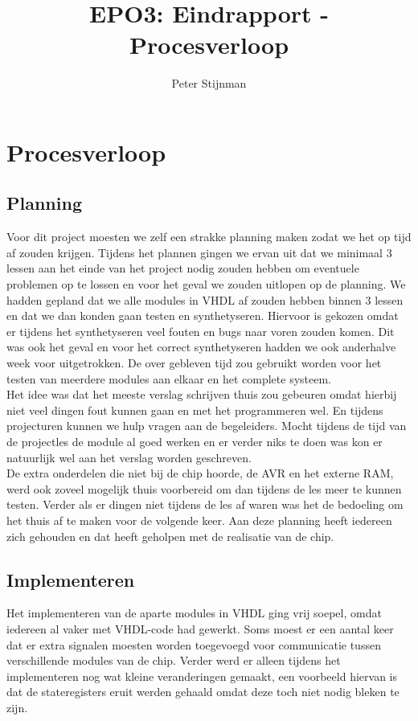 \documentclass{scrartcl} %
\author{Peter Stijnman}
\title{EPO3: Eindrapport - Procesverloop}
\begin{document}
\chapter{Procesverloop}
\label{ch:procesverloop}

\section{ Planning}

Voor dit project moesten we zelf een strakke planning maken zodat we het op tijd af zouden krijgen. Tijdens het plannen gingen we ervan uit dat we minimaal 3 lessen aan het einde van het project nodig zouden hebben om eventuele problemen op te lossen
en voor het geval we zouden uitlopen op de planning. We hadden gepland dat we alle modules in VHDL af zouden hebben binnen 3 lessen en dat we dan konden gaan testen en synthetyseren. Hiervoor is gekozen omdat er tijdens het synthetyseren veel fouten en bugs naar voren zouden komen.
Dit was ook het geval en voor het correct synthetyseren hadden we ook anderhalve week voor uitgetrokken. De over gebleven tijd zou gebruikt worden voor het testen van meerdere modules aan elkaar en het complete systeem.\\
Het idee was dat het meeste verslag schrijven thuis zou gebeuren omdat hierbij niet veel dingen fout kunnen gaan en met het programmeren wel. En tijdens projecturen kunnen we hulp vragen aan de begeleiders. Mocht tijdens de tijd van de projectles de module al goed werken en er verder niks te doen was kon er natuurlijk wel aan het verslag worden geschreven.\\ De extra onderdelen die niet bij de chip hoorde, de AVR en het externe RAM, werd ook zoveel mogelijk thuis voorbereid om dan tijdens de les meer te kunnen testen. Verder als er dingen niet tijdens de les af waren was het de bedoeling om het thuis af te maken voor de volgende keer. Aan deze planning heeft iedereen zich gehouden en dat heeft geholpen met de realisatie van de chip.

\section{Implementeren}

Het implementeren van de aparte modules in VHDL ging vrij soepel, omdat iedereen al vaker met VHDL-code had gewerkt. Soms moest er een aantal keer dat er extra signalen moesten worden toegevoegd voor communicatie tussen 
verschillende modules van de chip. Verder werd er alleen tijdens het implementeren nog wat kleine veranderingen gemaakt, een voorbeeld hiervan is dat de stateregisters eruit werden gehaald omdat deze toch niet nodig bleken te zijn. 
\end{document}
